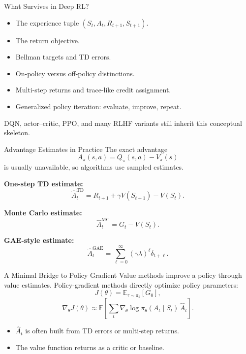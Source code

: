 \documentclass[aspectratio=169]{beamer}
\newcommand{\EE}{\mathbb{E}}
\begin{document}
\begin{frame}{What Survives in Deep RL?}
\small
\begin{itemize}
    \item The experience tuple $(S_t,A_t,R_{t+1},S_{t+1})$.
    \item The return objective.
    \item Bellman targets and TD errors.
    \item On-policy versus off-policy distinctions.
    \item Multi-step returns and trace-like credit assignment.
    \item Generalized policy iteration: evaluate, improve, repeat.
\end{itemize}

\vspace{0.7em}
DQN, actor--critic, PPO, and many RLHF variants still inherit this conceptual skeleton.
\end{frame}

\begin{frame}{Advantage Estimates in Practice}
\small
The exact advantage
\[
A_\pi(s,a)=Q_\pi(s,a)-V_\pi(s)
\]
is usually unavailable, so algorithms use sampled estimates.

\vspace{0.3em}
\textbf{One-step TD estimate:}
\[
\widehat A_t^{\text{TD}}
=R_{t+1}+\gamma V(S_{t+1})-V(S_t).
\]

\textbf{Monte Carlo estimate:}
\[
\widehat A_t^{\text{MC}}=G_t-V(S_t).
\]

\textbf{GAE-style estimate:}
\[
\widehat A_t^{\text{GAE}}
=\sum_{\ell=0}^{\infty}(\gamma\lambda)^\ell \delta_{t+\ell}.
\]
\end{frame}

\begin{frame}{A Minimal Bridge to Policy Gradient}
\small
Value methods improve a policy through value estimates. Policy-gradient methods directly optimize policy parameters:
\[
J(\theta)=\EE_{\tau\sim\pi_\theta}[G_0],
\]
\[
\nabla_\theta J(\theta)
\approx
\EE\left[
\sum_t \nabla_\theta\log\pi_\theta(A_t\mid S_t)\,\widehat{A}_t
\right].
\]

\vspace{0.6em}
\begin{itemize}
    \item $\widehat{A}_t$ is often built from TD errors or multi-step returns.
    \item The value function returns as a critic or baseline.
\end{itemize}
\end{frame}
\end{document}
